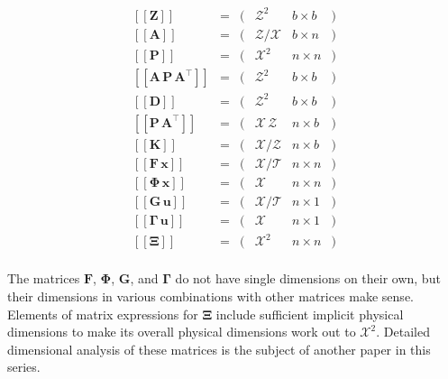 \documentclass[10pt,oneside,x11names]{article}
\begin{document}
\begin{equation}
\label{eqn:dimensional-breakdown}
\begin{array}{lccccr}
\left[\left[\mathbold{Z}\right]\right]                                       &=& (&\mathcal{Z}^2            & b\times{b}&) \\
\left[\left[\mathbold{A}\right]\right]                                       &=& (&\mathcal{Z}/\mathcal{X}  & b\times{n}&) \\
\left[\left[\mathbold{P}\right]\right]                                       &=& (&\mathcal{X}^2            & n\times{n}&) \\
\left[\left[\mathbold{A}\,\mathbold{P}\,\mathbold{A}^\intercal\right]\right] &=& (&\mathcal{Z}^2            & b\times{b}&) \\
\left[\left[\mathbold{D}\right]\right]                                       &=& (&\mathcal{Z}^2            & b\times{b}&) \\
\left[\left[\mathbold{P}\,\mathbold{A}^\intercal\right]\right]               &=& (&\mathcal{X}\,\mathcal{Z} & n\times{b}&) \\
\left[\left[\mathbold{K}\right]\right]                                       &=& (&\mathcal{X}/\mathcal{Z}  & n\times{b}&) \\
\left[\left[\mathbold{F}\,\mathbold{x}\right]\right]                         &=& (&\mathcal{X}/\mathcal{T}  & n\times{n}&) \\
\left[\left[\mathbold{\Phi}\,\mathbold{x}\right]\right]                      &=& (&\mathcal{X}              & n\times{n}&) \\
\left[\left[\mathbold{G}\,\mathbold{u}\right]\right]                         &=& (&\mathcal{X}/\mathcal{T}  & n\times{1}&) \\
\left[\left[\mathbold{\Gamma}\,\mathbold{u}\right]\right]                    &=& (&\mathcal{X}              & n\times{1}&) \\
\left[\left[\mathbold{\Xi}\right]\right]                                     &=& (&\mathcal{X}^2            & n\times{n}&) \\
\end{array}
\end{equation}

The matrices \(\mathbold{F}\), \(\mathbold{\Phi}\), \(\mathbold{G}\), and
\(\mathbold{\Gamma}\) do not have single dimensions on their own, but their
dimensions in various combinations with other matrices make sense. Elements of
matrix expressions for \(\mathbold{\Xi}\) include sufficient implicit physical
dimensions to make its overall physical dimensions work out to \(\mathcal{X}^2\).
Detailed dimensional analysis of these matrices is the subject of another paper
in this series.
\end{document}
